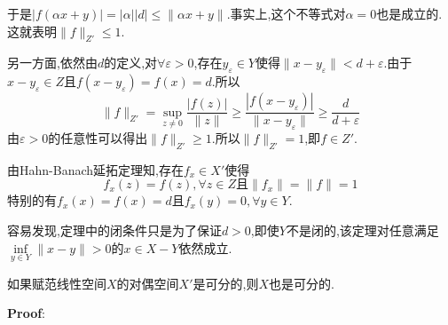 于是$|f(\alpha x+y)|=|\alpha||d|\leqslant \|\alpha x+y\|$.事实上,这个不等式对$\alpha=0$也是成立的.这就表明$\|f\|_{Z'}\leqslant 1$.\par
另一方面,依然由$d$的定义,对$\forall \varepsilon>0$,存在$y_{\varepsilon}\in Y$使得$\|x-y_{\varepsilon}\|<d+\varepsilon$.由于$x-y_{\varepsilon}\in Z$且$f(x-y_{\varepsilon})=f(x)=d$.所以
$$
\|f\|_{Z'}=\sup_{z\neq 0}\frac{|f(z)|}{\|z\|}\geqslant \frac{|f(x-y_{\varepsilon})|}{\|x-y_{\varepsilon}\|}\geqslant\frac{d}{d+\varepsilon}
$$
由$\varepsilon>0$的任意性可以得出$\|f\|_{Z'}\geqslant 1$.所以$\|f\|_{Z'}= 1$,即$f\in Z'$.\par
由Hahn-Banach延拓定理知,存在$f_x\in X'$使得
$$
f_x(z)=f(z),\forall z\in Z\text{且}\|f_x\|=\|f\|=1
$$
特别的有$f_x(x)=f(x)=d$且$f_x(y)=0,\forall y\in Y$.\par
容易发现,定理中的闭条件只是为了保证$d>0$,即使$Y$不是闭的,该定理对任意满足$\inf\limits_{y\in Y}\|x-y\|>0$的$x\in X-Y$依然成立.
\begin{tcolorbox}[colback=KuangNei,colframe=BianKuang,title=\textbf{赋范线性空间可分性的充分条件},sharpish corners]
如果赋范线性空间$X$的对偶空间$X'$是可分的,则$X$也是可分的.
\end{tcolorbox}
\textbf{Proof}:

























